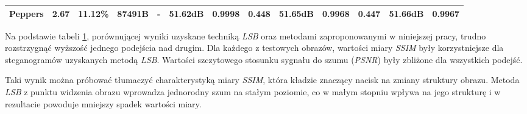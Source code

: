 {{\begin{table}[H]
{\begin{tabular}{ |l|c c c|c c c|c c c|c c c| }
                Peppers & 2.67 & 11.12\% & 87491B
                    & -     & 51.62dB & \textbf{0.9998}
                    & 0.448 & 51.65dB & 0.9968
                    & 0.447 & \textbf{51.66dB} & 0.9967 \\
                \hline
            \end{tabular}
            }
            \label{tab:exp-comparison-lsb}
        \end{table}

        Na podstawie tabeli \ref{tab:exp-comparison-lsb}, porównującej wyniki uzyskane techniką \textit{LSB} oraz
        metodami zaproponowanymi w niniejszej pracy, trudno rozstrzygnąć wyższość jednego podejścia nad drugim. Dla
        każdego z testowych obrazów, wartości miary \textit{SSIM} były korzystniejsze dla steganogramów uzyskanych
        metodą \textit{LSB}. Wartości szczytowego stosunku sygnału do szumu (\textit{PSNR}) były zbliżone dla wszystkich
        podejść.

        Taki wynik można próbować tłumaczyć charakterystyką miary \textit{SSIM}, która kładzie znaczący nacisk na zmiany
        struktury obrazu. Metoda \textit{LSB} z punktu widzenia obrazu wprowadza jednorodny szum na stałym poziomie, co
        w małym stopniu wpływa na jego strukturę i w rezultacie powoduje mniejszy spadek wartości miary.

}}
